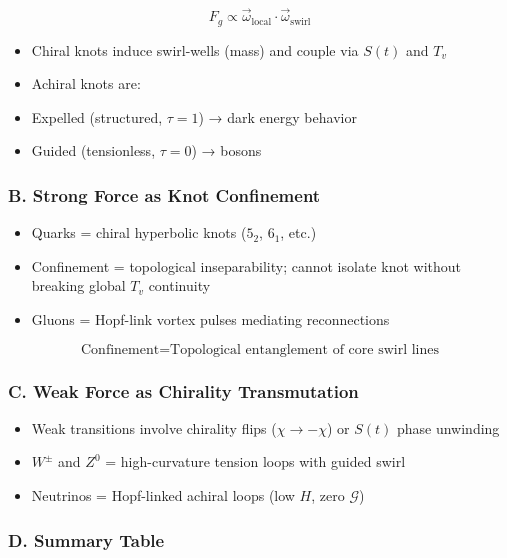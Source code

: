 \[
F_g \propto \vec{\omega}_{\text{local}} \cdot \vec{\omega}_{\text{swirl}}
\]

\begin{itemize}
    \item Chiral knots induce swirl-wells (mass) and couple via $S(t)$ and $T_v$
    \item Achiral knots are:
    \item Expelled (structured, $\tau=1$) → dark energy behavior
    \item Guided (tensionless, $\tau=0$) → bosons
\end{itemize}

\subsubsection*{B. Strong Force as Knot Confinement}

\begin{itemize}
    \item Quarks = chiral hyperbolic knots ($5_2$, $6_1$, etc.)
    \item Confinement = topological inseparability; cannot isolate knot without breaking global $T_v$ continuity
    \item Gluons = Hopf-link vortex pulses mediating reconnections
\end{itemize}

\[
\text{Confinement} = \text{Topological entanglement of core swirl lines}
\]

\subsubsection*{C. Weak Force as Chirality Transmutation}

\begin{itemize}
    \item Weak transitions involve chirality flips ($\chi \to -\chi$) or $S(t)$ phase unwinding
    \item $W^\pm$ and $Z^0$ = high-curvature tension loops with guided swirl
    \item Neutrinos = Hopf-linked achiral loops (low $H$, zero $\mathcal{G}$)
\end{itemize}

\subsubsection*{D. Summary Table}

